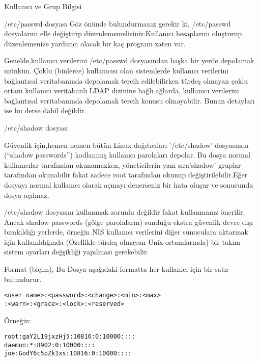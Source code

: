 \begin{section}{Kullanıcı ve Grup Bilgisi}
\begin{subsection}{/etc/passwd dosyası}
Göz önünde bulundurmanız gerekir ki, /etc/passwd dosyalarını elle değiştirip düzenlememelisiniz.Kullanıcı hesaplarını oluşturup düzenlemenize yardımcı olacak bir kaç program zaten var.

Genelde,kullanıcı verilerini /etc/passwd dosyasından başka bir yerde depolamak münkün. Çoklu (binlerce) kullanıcısı olan sistemlerde kullanıcı verilerini bağlantısal veritabanında depolamak tercih edilebilirken türdeş olmayan çoklu ortam kullanıcı veritabanlı LDAP dizinine bağlı ağlarda, kullanıcı verilerini bağlantısal veritabanında depolamak tercih konusu olmayabilir. Bunun detayları ise
bu derse dahil değildir.
\end{subsection}
\begin{subsection}{/etc/shadow dosyası}

Güvenlik için,hemen hemen bütün Linux dağıtıcıları '/etc/shadow' dosyasında (“shadow passwords”) kodlanmış kullanıcı parolaları depolar. Bu dosya normal kullanıcılar tarafından okunamazken, yöneticilerin yanı sıra'shadow' gruplar tarafından okunabilir fakat sadece root tarafından okunup değiştirilebilir.Eğer dosyayı normal kullanıcı olarak açmayı denerseniz bir hata oluşur ve sonucunda
dosya açılmaz.

/etc/shadow dosyasını kullanmak zorunlu değildir fakat kullanmanız önerilir. Ancak shadow passwords (gölge parolaların) sunduğu ekstra güvenlik devre dışı bırakıldığı yerlerde, örneğin NIS kullanıcı verilerini diğer sunuculara aktarmak için kullanıldığında (Özellikle türdeş olmayan Unix ortamlarında) bir takım sistem ayarları değşikliği yapılması gerekebilir.

Format (biçim), Bu Dosya aşağıdaki formatta her kullanıcı için bir satır bulundurur.
\begin{verbatim}
<user name>:<password>:<change>:<min>:<max>
:<warn>:<grace>:<lock>:<reserved>
\end{verbatim}

Örneğin:
\begin{verbatim}
root:gaY2L19jxzHj5:10816:0:10000::::
daemon:*:8902:0:10000::::
joe:GodY6c5pZk1xs:10816:0:10000::::
\end{verbatim}


\end{subsection}
\end{section}
